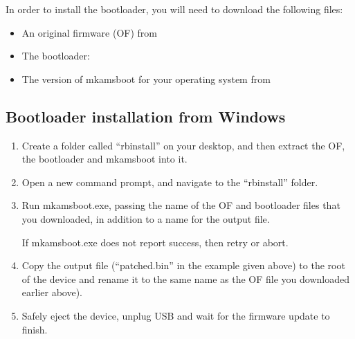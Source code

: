 
In order to install the bootloader, you will need to download the following
files:

\begin{itemize}
  \item An original firmware (OF) from 

  \item The bootloader: 

  \item The version of mkamsboot for your operating system from
\end{itemize}

\subsection{Bootloader installation from Windows}

\begin{enumerate}

\item Create a folder called ``rbinstall'' on your desktop, and then extract
  the OF, the bootloader and mkamsboot into it.

\item Open a new command prompt, and navigate to the ``rbinstall'' folder.

\item Run mkamsboot.exe, passing the name of the OF and bootloader files that
  you downloaded, in addition to a name for the output file.

  \begin{code} 
  \end{code}
 
  If mkamsboot.exe does not report success, then retry or abort.

\item Copy the output file (``patched.bin'' in the example given above) to the
  root of the device and rename it to the same name as the OF file you downloaded earlier 
    above).

\item Safely eject the device, unplug USB and wait for the firmware update to finish.
\end{enumerate}

